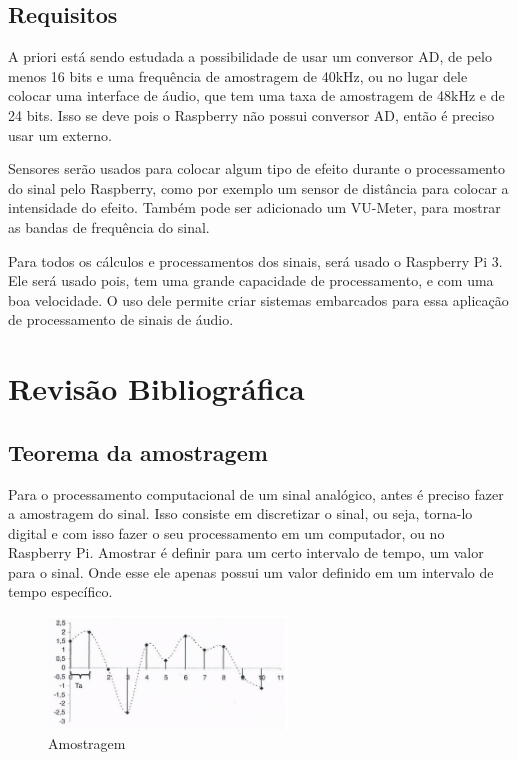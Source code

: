 \documentclass[conference]{IEEEtran}
\begin{document}
\subsection{Requisitos}
A priori está sendo estudada a possibilidade de usar um conversor AD, de pelo menos 16 bits e uma frequência de amostragem de 40kHz, ou no lugar dele colocar uma interface de áudio, que tem uma taxa de amostragem de 48kHz e de 24 bits. Isso se deve pois o Raspberry não possui conversor AD, então é preciso usar um externo. 

Sensores serão usados para colocar algum tipo de efeito durante o processamento do sinal pelo Raspberry, como por exemplo um sensor de distância para colocar a intensidade do efeito. Também pode ser adicionado um VU-Meter, para mostrar as bandas de frequência do sinal. 

Para todos os cálculos e processamentos dos sinais, será usado o Raspberry Pi 3. Ele será usado pois, tem uma grande capacidade de processamento, e com uma boa velocidade. O uso dele permite criar sistemas embarcados para essa aplicação de processamento de sinais de áudio.


\section{Revisão Bibliográfica}
\subsection{Teorema da amostragem}
Para o processamento computacional de um sinal analógico, antes é preciso fazer a amostragem do sinal. Isso consiste em discretizar o sinal, ou seja, torna-lo digital e com isso fazer o seu processamento em um computador, ou no Raspberry Pi. Amostrar é definir para um certo intervalo de tempo, um valor para o sinal. Onde esse ele apenas possui um valor definido em um intervalo de tempo específico.

\begin{figure}[!h]%
\centering

\includegraphics[width=2.5in]{Imagens/amostragem1} %
\caption{Amostragem}

\label{amos}
\end{figure}
\end{document}
